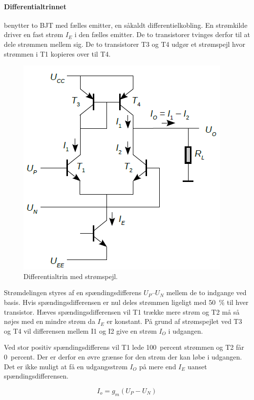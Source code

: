 \documentclass[danish]{article}
\begin{document}
\paragraph{Differentialtrinnet} benytter to BJT med fælles emitter, en såkaldt differentielkobling. En strømkilde driver en fast strøm $I_E$ i den fælles emitter. De to transistorer tvinges derfor til at dele strømmen mellem sig. De to transistorer T3 og T4 udgør et strømspejl hvor strømmen i T1 kopieres over til T4. 

\begin{figure} [H]
	\centering
	\includegraphics[width=0.68\linewidth]{graphics/differentialtrin}
	\caption{Differentialtrin med strømspejl.}
	\label{fig:differentialtrin}
\end{figure}
	
Strømdelingen styres af en spændingsdifferens $U_P – U_N$ mellem de to indgange ved basis. Hvis spændingsdifferensen er nul deles strømmen ligeligt med \SI{50}{\percent} til hver transistor. 
Hæves spændingsdifferensen vil T1 trække mere strøm og T2 må så nøjes med en mindre strøm da $I_E$ er konstant. 
På grund af strømspejlet ved T3 og T4 vil differensen mellem I1 og I2 give en strøm $I_O$ i udgangen.
	
Ved stor positiv spændingsdifferens vil T1 lede \SI{100}{percent} strømmen og T2 får \SI{0}{percent}. Der er derfor en øvre grænse for den strøm der kan løbe i udgangen. Det er ikke muligt at få en udgangsstrøm $I_O$ på mere end $I_E$ uanset spændingsdifferensen. 

\begin{equation} 
I_o = g_m(U_P-U_N)
\end{equation}
\end{document}
